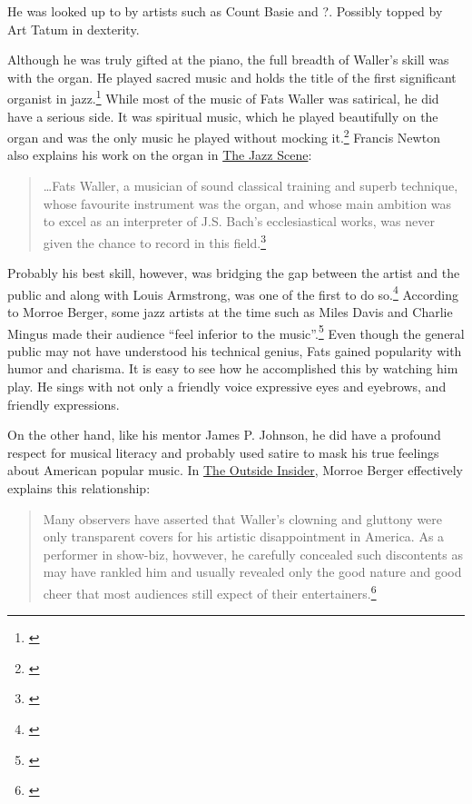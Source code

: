 \documentclass[11pt]{report}
\begin{document}
	
	
	
	He was looked up to by artists such as Count Basie and ?.
	Possibly topped by Art Tatum in dexterity.





	\label{sec:oregon}
	Although he was truly gifted at the piano, the full breadth of Waller's skill was with the organ. He played sacred music and holds the title of the first significant organist in jazz.\footnote{\cite[40]{grove-book:waller}} While most of the music of Fats Waller was satirical, he did have a serious side. It was spiritual music, which he played beautifully on the organ and was the only music he played without mocking it.\footnote{\cite[8]{outside-insider}} Francis Newton also explains his work on the organ in \underline{The Jazz Scene}:
	\begin{quote}
		\ldots Fats Waller, a musician of sound classical training and superb technique, whose favourite instrument was the organ, and whose main ambition was to excel as an interpreter of J.S. Bach's ecclesiastical works, was never given the chance to record in this field.\footnote{\cite[209]{jazz_scene}}
	\end{quote}

	\label{sec:charisma}
	Probably his best skill, however, was bridging the gap between the artist and the public and along with Louis Armstrong, was one of the first to do so.\footnote{\cite[3]{life}} According to Morroe Berger, some jazz artists at the time such as Miles Davis and Charlie Mingus made their audience ``feel inferior to the music''.\footnote{\cite[16]{outside-insider}} Even though the general public may not have understood his technical genius, Fats gained popularity with humor and charisma. It is easy to see how he accomplished this by watching him play. He sings with not only a friendly voice expressive eyes and eyebrows, and friendly expressions.
	
	\label{sec:respect}
	
	On the other hand, like his mentor James P. Johnson, he did have a profound respect for musical literacy and probably used satire to mask his true feelings about American popular music. In \underline{The Outside Insider}, Morroe Berger effectively explains this relationship:
	\begin{quote}
		Many observers have asserted that Waller's clowning and gluttony were only transparent covers for his artistic disappointment in America. As a performer in show-biz, hovwever, he carefully concealed such discontents as may have rankled him and usually revealed only the good nature and good cheer that most audiences still expect of their entertainers.\footnote{\cite[4]{outside-insider}}
	\end{quote}
\end{document}
